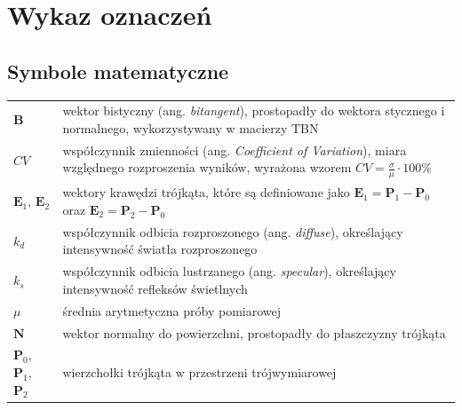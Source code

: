 \section{Wykaz oznaczeń}

\subsection*{Symbole matematyczne}

\begin{tabular}{@{}p{2.5cm}p{11.75cm}@{}}
  $\mathbf{B}$                                   & wektor bistyczny (ang. \textit{bitangent}), prostopadły do wektora stycznego i normalnego, wykorzystywany w macierzy TBN                                       \\[0.5em]
  $CV$                                           & współczynnik zmienności (ang. \textit{Coefficient of Variation}), miara względnego rozproszenia wyników, wyrażona wzorem $CV = \frac{\sigma}{\mu} \cdot 100\%$ \\[0.5em]
  $\mathbf{E}_1$, $\mathbf{E}_2$                 & wektory krawędzi trójkąta, które są definiowane jako $\mathbf{E}_1 = \mathbf{P}_1 - \mathbf{P}_0$ oraz $\mathbf{E}_2 = \mathbf{P}_2 - \mathbf{P}_0$            \\[0.5em]
  $k_d$                                          & współczynnik odbicia rozproszonego (ang. \textit{diffuse}), określający intensywność światła rozproszonego                                                     \\[0.5em]
  $k_s$                                          & współczynnik odbicia lustrzanego (ang. \textit{specular}), określający intensywność refleksów świetlnych                                                       \\[0.5em]
  $\mu$                                          & średnia arytmetyczna próby pomiarowej                                                                                                                          \\[0.5em]
  $\mathbf{N}$                                   & wektor normalny do powierzchni, prostopadły do płaszczyzny trójkąta                                                                                            \\[0.5em]
  $\mathbf{P}_0$, $\mathbf{P}_1$, $\mathbf{P}_2$ & wierzchołki trójkąta w przestrzeni trójwymiarowej                                                                                                              \\[0.5em]

\end{tabular}
